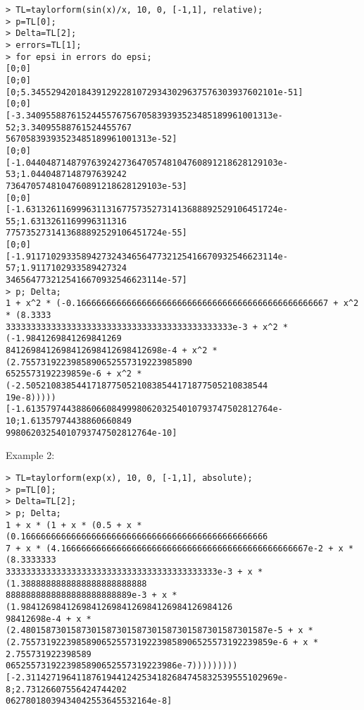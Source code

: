 \begin{center}\begin{minipage}{15cm}\begin{Verbatim}[frame=single]
> TL=taylorform(sin(x)/x, 10, 0, [-1,1], relative);
> p=TL[0];
> Delta=TL[2];
> errors=TL[1];
> for epsi in errors do epsi;
[0;0]
[0;0]
[0;5.3455294201843912922810729343029637576303937602101e-51]
[0;0]
[-3.3409558876152445576756705839393523485189961001313e-52;3.34095588761524455767
56705839393523485189961001313e-52]
[0;0]
[-1.04404871487976392427364705748104760891218628129103e-53;1.0440487148797639242
7364705748104760891218628129103e-53]
[0;0]
[-1.63132611699963113167757352731413688892529106451724e-55;1.6313261169996311316
7757352731413688892529106451724e-55]
[0;0]
[-1.91171029335894273243465647732125416670932546623114e-57;1.9117102933589427324
3465647732125416670932546623114e-57]
> p; Delta;
1 + x^2 * (-0.16666666666666666666666666666666666666666666666667 + x^2 * (8.3333
333333333333333333333333333333333333333333333e-3 + x^2 * (-1.9841269841269841269
8412698412698412698412698412698e-4 + x^2 * (2.7557319223985890652557319223985890
6525573192239859e-6 + x^2 * (-2.505210838544171877505210838544171877505210838544
19e-8)))))
[-1.6135797443886066084999806203254010793747502812764e-10;1.61357974438860660849
99806203254010793747502812764e-10]
\end{Verbatim}
\end{minipage}\end{center}
\noindent Example 2: 
\begin{center}\begin{minipage}{15cm}\begin{Verbatim}[frame=single]
> TL=taylorform(exp(x), 10, 0, [-1,1], absolute);
> p=TL[0];
> Delta=TL[2];
> p; Delta;
1 + x * (1 + x * (0.5 + x * (0.1666666666666666666666666666666666666666666666666
7 + x * (4.1666666666666666666666666666666666666666666666667e-2 + x * (8.3333333
333333333333333333333333333333333333333333e-3 + x * (1.3888888888888888888888888
8888888888888888888888889e-3 + x * (1.984126984126984126984126984126984126984126
98412698e-4 + x * (2.4801587301587301587301587301587301587301587301587e-5 + x * 
(2.75573192239858906525573192239858906525573192239859e-6 + x * 2.755731922398589
0652557319223985890652557319223986e-7)))))))))
[-2.31142719641187619441242534182684745832539555102969e-8;2.73126607556424744202
06278018039434042553645532164e-8]
\end{Verbatim}
\end{minipage}\end{center}
